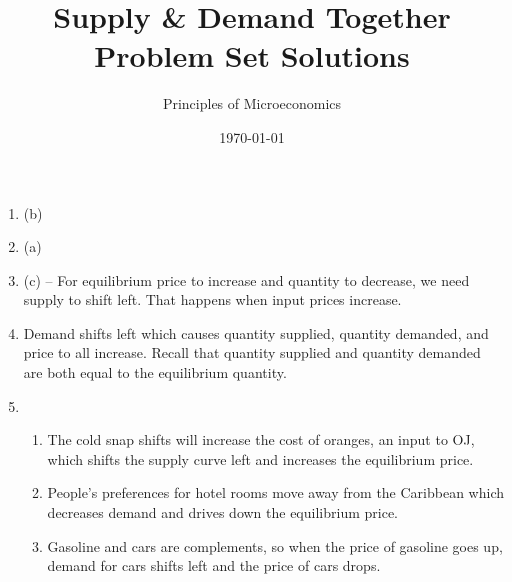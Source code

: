 \documentclass{article}
\title{Supply \& Demand Together Problem Set Solutions}
\author{Principles of Microeconomics}
\date{\today}
\begin{document}
\maketitle

\begin{enumerate}

\item (b)

\item (a)

\item (c) -- For equilibrium price to increase and quantity to decrease, we need supply to shift left. That happens when input prices increase.

\item Demand shifts left which causes quantity supplied, quantity demanded, and price to all increase. Recall that quantity supplied and quantity demanded are both equal to the equilibrium quantity. 

\item
	\begin{enumerate}
	
	\item The cold snap shifts will increase the cost of oranges, an input to OJ, which shifts the supply curve left and increases the equilibrium price.
	
	\item People's preferences for hotel rooms move away from the Caribbean which decreases demand and drives down the equilibrium price.
	
	\item Gasoline and cars are complements, so when the price of gasoline goes up, demand for cars shifts left and the price of cars drops.
	
	\end{enumerate}

\end{enumerate}
\end{document}
